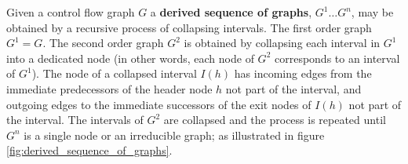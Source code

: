 
Given a control flow graph $G$ a \textbf{derived sequence of graphs}, $G^1 \dots G^n$, may be obtained by a recursive process of collapsing intervals. The first order graph $G^1 = G$. The second order graph $G^2$ is obtained by collapsing each interval in $G^1$ into a dedicated node (in other words, each node of $G^2$ corresponds to an interval of $G^1$). The node of a collapsed interval $I(h)$ has incoming edges from the immediate predecessors of the header node $h$ not part of the interval, and outgoing edges to the immediate successors of the exit nodes of $I(h)$ not part of the interval. The intervals of $G^2$ are collapsed and the process is repeated until $G^n$ is a single node or an irreducible graph; as illustrated in figure \ref{fig:derived_sequence_of_graphs}.

